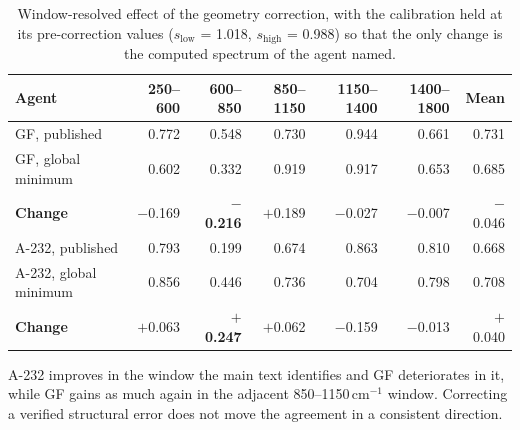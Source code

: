 \documentclass[11pt]{article}
\newcommand*\wn{\ensuremath{\text{cm}^{-1}}}
\begin{document}
\begin{table}[htbp]
\centering
\caption{Window-resolved effect of the geometry correction, with the calibration held at
its pre-correction values ($s_\mathrm{low}$ = 1.018, $s_\mathrm{high}$ = 0.988) so that
the only change is the computed spectrum of the agent named.}
\label{tab:si-geomwindow}
\small
\begin{tabular}{lrrrrrr}
\toprule
Agent & 250--600 & 600--850 & 850--1150 & 1150--1400 & 1400--1800 & Mean \\
\midrule
GF, published & 0.772 & 0.548 & 0.730 & 0.944 & 0.661 & 0.731 \\
GF, global minimum & 0.602 & 0.332 & 0.919 & 0.917 & 0.653 & 0.685 \\
\textbf{Change} & $-$0.169 & \textbf{$-$0.216} & $+$0.189 & $-$0.027 & $-$0.007 & $-$0.046 \\
\midrule
A-232, published & 0.793 & 0.199 & 0.674 & 0.863 & 0.810 & 0.668 \\
A-232, global minimum & 0.856 & 0.446 & 0.736 & 0.704 & 0.798 & 0.708 \\
\textbf{Change} & $+$0.063 & \textbf{$+$0.247} & $+$0.062 & $-$0.159 & $-$0.013 & $+$0.040 \\
\bottomrule
\end{tabular}

\begin{flushleft}\footnotesize A-232 improves in the window the main text identifies and
GF deteriorates in it, while GF gains as much again in the adjacent 850--1150\,\wn{}
window. Correcting a verified structural error does not move the agreement in a
consistent direction.\end{flushleft}
\end{table}
\end{document}
